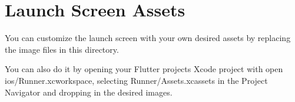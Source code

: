 \chapter{Launch Screen Assets}
\hypertarget{md_ios_2_runner_2_assets_8xcassets_2_launch_image_8imageset_2_r_e_a_d_m_e}{}\label{md_ios_2_runner_2_assets_8xcassets_2_launch_image_8imageset_2_r_e_a_d_m_e}
\label{md_ios_2_runner_2_assets_8xcassets_2_launch_image_8imageset_2_r_e_a_d_m_e_autotoc_md138}%
%


You can customize the launch screen with your own desired assets by replacing the image files in this directory.

You can also do it by opening your Flutter project\textquotesingle{}s Xcode project with {\ttfamily open ios/\+Runner.\+xcworkspace}, selecting {\ttfamily Runner/\+Assets.\+xcassets} in the Project Navigator and dropping in the desired images. 